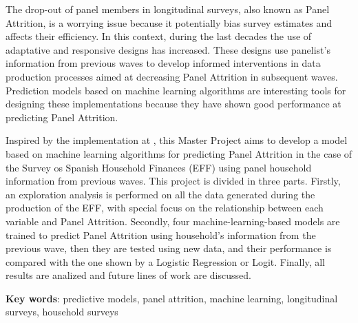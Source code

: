 \onehalfspacing

The drop-out of panel members in longitudinal surveys, also known as Panel Attrition, is a worrying issue because it potentially bias survey estimates and affects their efficiency. In this context, during the last decades the use of adaptative and responsive designs has increased. These designs use panelist's information from previous waves to develop informed interventions in data production processes aimed at decreasing Panel Attrition in subsequent waves. Prediction models based on machine learning algorithms are interesting tools for designing these implementations because they have shown good performance at predicting Panel Attrition.

Inspired by the implementation at \cite{beste2023case}, this Master Project aims to develop a model based on machine learning algorithms for predicting Panel Attrition in the case of the Survey os Spanish Household Finances (EFF) using panel household information from previous waves. This project is divided in three parts. Firstly, an exploration analysis is performed on all the data generated during the production of the EFF, with special focus on the relationship between each variable and Panel Attrition. Secondly, four machine-learning-based models are trained to predict Panel Attrition using household's information from the previous wave, then they are tested using new data, and their performance is compared with the one shown by a Logistic Regression or Logit. Finally, all results are analized and future lines of work are discussed.

\vspace{1.5cm}

\textbf{Key words}: predictive models, panel attrition, machine learning, longitudinal surveys, household surveys